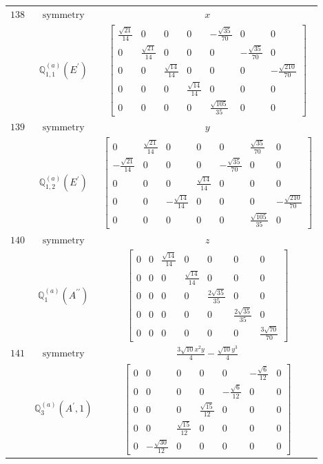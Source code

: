 \documentclass[fleqn,8pt,landscape]{jsarticle}
\begin{document}
\begin{longtable}{ccc}
$ 138 $ & $ \text{symmetry} $ & $ x $ \\
$  $ & $ \mathbb{Q}_{1,1}^{(a)}(E^{\prime}) $ & $ \begin{bmatrix} \frac{\sqrt{21}}{14} & 0 & 0 & 0 & - \frac{\sqrt{35}}{70} & 0 & 0 \\ 0 & \frac{\sqrt{21}}{14} & 0 & 0 & 0 & - \frac{\sqrt{35}}{70} & 0 \\ 0 & 0 & \frac{\sqrt{14}}{14} & 0 & 0 & 0 & - \frac{\sqrt{210}}{70} \\ 0 & 0 & 0 & \frac{\sqrt{14}}{14} & 0 & 0 & 0 \\ 0 & 0 & 0 & 0 & \frac{\sqrt{105}}{35} & 0 & 0 \end{bmatrix} $ \\ \hline
$ 139 $ & $ \text{symmetry} $ & $ y $ \\
$  $ & $ \mathbb{Q}_{1,2}^{(a)}(E^{\prime}) $ & $ \begin{bmatrix} 0 & \frac{\sqrt{21}}{14} & 0 & 0 & 0 & \frac{\sqrt{35}}{70} & 0 \\ - \frac{\sqrt{21}}{14} & 0 & 0 & 0 & - \frac{\sqrt{35}}{70} & 0 & 0 \\ 0 & 0 & 0 & \frac{\sqrt{14}}{14} & 0 & 0 & 0 \\ 0 & 0 & - \frac{\sqrt{14}}{14} & 0 & 0 & 0 & - \frac{\sqrt{210}}{70} \\ 0 & 0 & 0 & 0 & 0 & \frac{\sqrt{105}}{35} & 0 \end{bmatrix} $ \\ \hline
$ 140 $ & $ \text{symmetry} $ & $ z $ \\
$  $ & $ \mathbb{Q}_{1}^{(a)}(A^{\prime\prime}) $ & $ \begin{bmatrix} 0 & 0 & \frac{\sqrt{14}}{14} & 0 & 0 & 0 & 0 \\ 0 & 0 & 0 & \frac{\sqrt{14}}{14} & 0 & 0 & 0 \\ 0 & 0 & 0 & 0 & \frac{2 \sqrt{35}}{35} & 0 & 0 \\ 0 & 0 & 0 & 0 & 0 & \frac{2 \sqrt{35}}{35} & 0 \\ 0 & 0 & 0 & 0 & 0 & 0 & \frac{3 \sqrt{70}}{70} \end{bmatrix} $ \\ \hline
$ 141 $ & $ \text{symmetry} $ & $ \frac{3 \sqrt{10} x^{2} y}{4} - \frac{\sqrt{10} y^{3}}{4} $ \\
$  $ & $ \mathbb{Q}_{3}^{(a)}(A^{\prime},1) $ & $ \begin{bmatrix} 0 & 0 & 0 & 0 & 0 & - \frac{\sqrt{6}}{12} & 0 \\ 0 & 0 & 0 & 0 & - \frac{\sqrt{6}}{12} & 0 & 0 \\ 0 & 0 & 0 & \frac{\sqrt{15}}{12} & 0 & 0 & 0 \\ 0 & 0 & \frac{\sqrt{15}}{12} & 0 & 0 & 0 & 0 \\ 0 & - \frac{\sqrt{30}}{12} & 0 & 0 & 0 & 0 & 0 \end{bmatrix} $ \\ \hline

\end{longtable}
\end{document}
